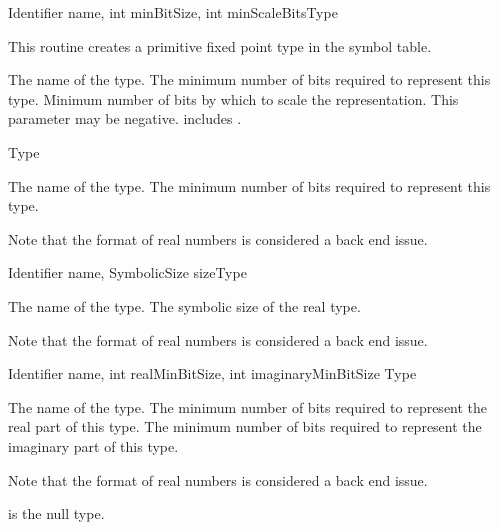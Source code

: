 	{Identifier name, int minBitSize, int minScaleBits}{}{Type}
\begin{functionality}
This routine creates a primitive fixed point type in the symbol table.
\begin{Parameters}
 The name of the type.
 The minimum number of bits required to represent 
this type.
 Minimum number of bits by which to scale the
representation.  This parameter may be negative.  
includes .
\end{Parameters}
\end{functionality}

	{}{Type}
\begin{functionality}
\begin{Parameters}
 The name of the type.
 The minimum number of bits required to represent this
type.
\end{Parameters}
Note that the format of real numbers is considered a back end issue.  
\end{functionality}

	{Identifier name, SymbolicSize size}{}{Type}
\begin{functionality}
\begin{Parameters}
 The name of the type.
 The symbolic size of the real type.  
\end{Parameters}
Note that the format of real numbers is considered a back end issue.  
\end{functionality}

	{Identifier name, int realMinBitSize, int imaginaryMinBitSize}
	{}{Type}
\begin{functionality}
\begin{Parameters}
 The name of the type.
 The minimum number of bits required to
represent the real part of this type.
 The minimum number of bits required to
represent the imaginary part of this type.
\end{Parameters}
Note that the format of real numbers is considered a back end issue.  
\end{functionality}

\begin{functionality}
 is the null type.  
\end{functionality}

